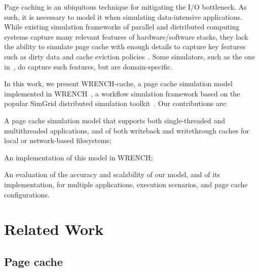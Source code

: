 \documentclass[conference]{IEEEtran}
\newcommand{\simgrid}{SimGrid\xspace}
\newcommand{\wrench}{WRENCH\xspace}
\begin{document}
        Page caching is an ubiquitous technique for mitigating the I/O bottleneck.
        As such, it is necessary to model it
        when simulating data-intensive applications.
        While existing simulation frameworks of parallel and distributed computing
        systems  capture many relevant features of hardware/software stacks, 
        they lack the ability to simulate page cache with enough details to capture key features such
        as dirty data and cache eviction policies~\cite{nunez2012simcan,nunez2012icancloud}. 
        Some simulators, such as the one in~\cite{xu2018saving}, do capture such features,
        but are domain-specific. 


    In this work, we present \wrench-cache, a page cache simulation model
    implemented in \wrench~\cite{casanova2020fgcs}, a workflow simulation
    framework based on the popular \simgrid distributed simulation
    toolkit~\cite{casanova2014simgrid}. Our contributions are:
    \begin{compactitem}
        \item A page cache simulation model that supports 
    both single-threaded and multithreaded applications, and of both
    writeback and writethrough caches for local or network-based
    filesystems;
        \item An implementation of this model in \wrench; 
        \item An evaluation of the accuracy and scalability of our model, and of its implementation,
              for multiple applications, execution scenarios, and page cache configurations. 
    \end{compactitem}


    \section{Related Work}
    \label{relatedwork}

        \subsection{Page cache}
\end{document}
